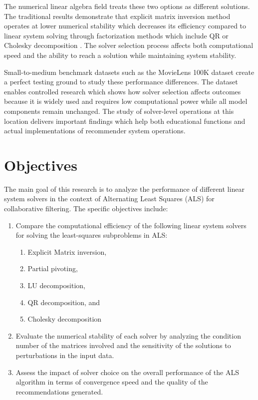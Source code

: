\documentclass[12pt,a4paper]{report}
\begin{document}
The numerical linear algebra field treats these two options as different solutions. The traditional results demonstrate that explicit matrix inversion method operates at lower numerical stability which decreases its efficiency compared to linear system solving through factorization methods which include QR or Cholesky decomposition \parencite{trefethen1997numerical, golub2013matrix}. The solver selection process affects both computational speed and the ability to reach a solution while maintaining system stability.

Small-to-medium benchmark datasets such as the MovieLens 100K dataset create a perfect testing ground to study these performance differences. The dataset enables controlled research which shows how solver selection affects outcomes because it is widely used and requires low computational power while all model components remain unchanged. The study of solver-level operations at this location delivers important findings which help both educational functions and actual implementations of recommender system operations.

\section{Objectives}
The main goal of this research is to analyze the performance of different linear system solvers in the context of Alternating Least Squares (ALS) for collaborative filtering. The specific objectives include:
\begin{enumerate}
\item Compare the computational efficiency of the following linear system solvers for solving the least-squares subproblems in ALS:
\begin{enumerate}[label*=\arabic*.]
\item Explicit Matrix inversion,
\item Partial pivoting,
\item LU decomposition,
\item QR decomposition, and
\item Cholesky decomposition
\end{enumerate}
\item Evaluate the numerical stability of each solver by analyzing the condition number of the matrices involved and the sensitivity of the solutions to perturbations in the input data.
\item Assess the impact of solver choice on the overall performance of the ALS algorithm in terms of convergence speed and the quality of the recommendations generated.

\end{enumerate}
\end{document}

